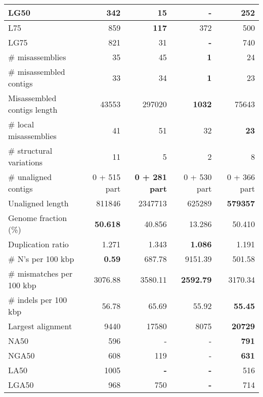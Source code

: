 \documentclass[12pt,a4paper]{article}
\begin{document}
\begin{table}[ht]
\begin{center}
\begin{tabular}{|l*{4}{|r}|}
LG50 & 342 & 15 & {\bf -} & 252 \\ \hline
L75 & 859 & {\bf 117} & 372 & 500 \\ \hline
LG75 & 821 & 31 & {\bf -} & 740 \\ \hline
\# misassemblies & 35 & 45 & {\bf 1} & 24 \\ \hline
\# misassembled contigs & 33 & 34 & {\bf 1} & 23 \\ \hline
Misassembled contigs length & 43553 & 297020 & {\bf 1032} & 75643 \\ \hline
\# local misassemblies & 41 & 51 & 32 & {\bf 23} \\ \hline
\# structural variations & 11 & 5 & 2 & 8 \\ \hline
\# unaligned contigs & 0 + 515 part & {\bf 0 + 281 part} & 0 + 530 part & 0 + 366 part \\ \hline
Unaligned length & 811846 & 2347713 & 625289 & {\bf 579357} \\ \hline
Genome fraction (\%) & {\bf 50.618} & 40.856 & 13.286 & 50.410 \\ \hline
Duplication ratio & 1.271 & 1.343 & {\bf 1.086} & 1.191 \\ \hline
\# N's per 100 kbp & {\bf 0.59} & 687.78 & 9151.39 & 501.58 \\ \hline
\# mismatches per 100 kbp & 3076.88 & 3580.11 & {\bf 2592.79} & 3170.34 \\ \hline
\# indels per 100 kbp & 56.78 & 65.69 & 55.92 & {\bf 55.45} \\ \hline
Largest alignment & 9440 & 17580 & 8075 & {\bf 20729} \\ \hline
NA50 & 596 & - & - & {\bf 791} \\ \hline
NGA50 & 608 & 119 & - & {\bf 631} \\ \hline
LA50 & 1005 & {\bf -} & {\bf -} & 516 \\ \hline
LGA50 & 968 & 750 & {\bf -} & 714 \\ \hline
\end{tabular}
\end{center}
\end{table}
\end{document}
